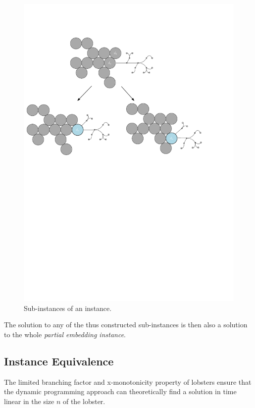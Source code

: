 \documentclass[draft,final]{vutinfth} %
\begin{document}
\begin{figure}[h]
    \centering
    \includegraphics[width=\textwidth]{graphics/dp-subproblems.pdf}
    \caption{Sub-instances of an instance.}
    \label{fig:my_label}
\end{figure}

The solution to any of the thus constructed sub-instances is then also a solution to the whole \emph{partial embedding instance}.

\subsection{Instance Equivalence}

The limited branching factor and x-monotonicity property of lobsters ensure that the dynamic programming approach can theoretically find a solution in time linear in the size $n$ of the lobster.
\end{document}
